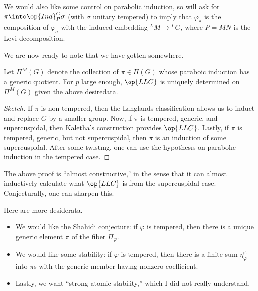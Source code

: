 \documentclass{article}
\begin{document}
We would also like some control on parabolic induction, so  will ask for $\pi\into\op{Ind}_P^G\sigma$ (with $\sigma$ unitary tempered) to imply that $\varphi_\pi$ is the composition of $\varphi_\sigma$ with the induced embedding $^LM\to{}^LG$, where $P=MN$ is the Levi decomposition.

We are now ready to note that we have gotten somewhere.
\begin{theorem}
	Let $\Pi^{M}(G)$ denote the collection of $\pi\in\Pi(G)$ whose paraboic induction has a generic quotient. For $p$ large enough, $\op{LLC}$ is uniquely determined on $\Pi^M(G)$ given the above desiredata.
\end{theorem}
\begin{proof}[Sketch]
	If $\pi$ is non-tempered, then the Langlands classification allows us to induct and replace $G$ by a smaller group. Now, if $\pi$ is tempered, generic, and supercuspidal, then Kaletha's construction provides $\op{LLC}$. Lastly, if $\pi$ is tempered, generic, but not supercuspidal, then $\pi$ is an induction of some supercuspidal. After some twisting, one can use the hypothesis on parabolic induction in the tempered case.
\end{proof}
\begin{remark}
	The above proof is ``almost constructive,'' in the sense that it can almost inductively calculate what $\op{LLC}$ is from the supercuspidal case. Conjecturally, one can sharpen this.
\end{remark}
Here are more desiderata.
\begin{itemize}
	\item We would like the Shahidi conjecture: if $\varphi$ is tempered, then there is a unique generic element $\pi$ of the fiber $\Pi_\varphi$.
	\item We would like some stability: if $\varphi$ is tempered, then there is a finite sum $\eta_\varphi^{\mathrm{st}}$ into $\pi$s with the generic member having nonzero coefficient.
	\item Lastly, we want ``strong atomic stability,'' which I did not really understand.
\end{itemize}
\end{document}
